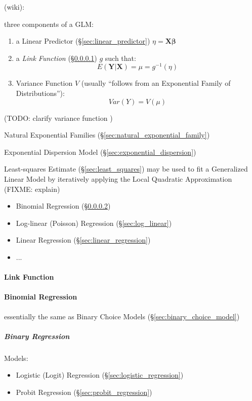 (wiki):

three components of a GLM:
\begin{enumerate}
  \item a Linear Predictor (\S\ref{sec:linear_predictor})
    $\eta = \mathbf{X\beta}$
  \item a \emph{Link Function} (\S\ref{sec:link_function}) $g$ such that:
    \[
      E(\mathbf{Y}|\mathbf{X}) = \mu = g^{-1}(\eta)
    \]
  \item Variance Function $V$ (usually ``follows from an Exponential Family of
    Distributions''):
    \[
      Var(Y) = V(\mu)
    \]
\end{enumerate}
(TODO: clarify variance function )

Natural Exponential Families (\S\ref{sec:natural_exponential_family})

Exponential Dispersion Model (\S\ref{sec:exponential_dispersion})

Least-squares Estimate (\S\ref{sec:least_squares}) may be used to fit a
Generalized Linear Model by iteratively applying the Local Quadratic
Approximation (FIXME: explain)

\begin{itemize}
  \item Binomial Regression (\S\ref{sec:binomial_regression})
  \item Log-linear (Poisson) Regression (\S\ref{sec:log_linear})
  \item Linear Regression (\S\ref{sec:linear_regression})
  \item ...
\end{itemize}



\paragraph{Link Function}\label{sec:link_function}\hfill

\paragraph{Binomial Regression}\label{sec:binomial_regression}\hfill

essentially the same as Binary Choice Models (\S\ref{sec:binary_choice_model})



\subparagraph{Binary Regression}\label{sec:binary_regression}

Models:
\begin{itemize}
  \item Logistic (Logit) Regression (\S\ref{sec:logistic_regression})
  \item Probit Regression (\S\ref{sec:probit_regression})
\end{itemize}



